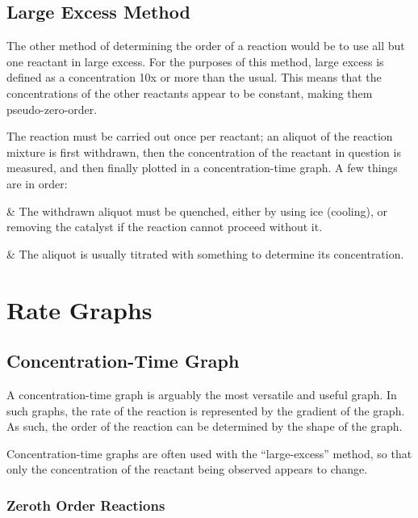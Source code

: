 		\subsection{Large Excess Method}

			The other method of determining the order of a reaction would be to use all but one reactant in large excess. For the purposes of this
			method, large excess is defined as a concentration 10x or more than the usual. This means that the concentrations of the other
			reactants appear to be constant, making them pseudo-zero-order.

			The reaction must be carried out once per reactant; an aliquot of the reaction mixture is first withdrawn, then the concentration of the
			reactant in question is measured, and then finally plotted in a concentration-time graph. A few things are in order:

			\begin{bulletlist}
				&	The withdrawn aliquot must be quenched, either by using ice (cooling), or removing the catalyst if the reaction cannot proceed
					without it.

				&	The aliquot is usually titrated with something to determine its concentration.
			\end{bulletlist}






	\pagebreak
	\section{Rate Graphs}

		\subsection{Concentration-Time Graph}

			A concentration-time graph is arguably the most versatile and useful graph. In such graphs, the rate of the reaction is represented
			by the gradient of the graph. As such, the order of the reaction can be determined by the shape of the graph.

			Concentration-time graphs are often used with the ``large-excess'' method, so that only the concentration of the reactant being
			observed appears to change.


			\subsubsection{Zeroth Order Reactions}

